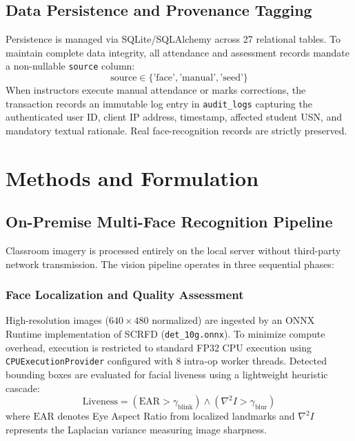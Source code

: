 \documentclass[conference]{IEEEtran}
\begin{document}
\subsection{Data Persistence and Provenance Tagging}
Persistence is managed via SQLite/SQLAlchemy across 27 relational tables. To maintain complete data integrity, all attendance and assessment records mandate a non-nullable \texttt{source} column:
\begin{equation}
\text{source} \in \{\text{'face'}, \text{'manual'}, \text{'seed'}\}
\end{equation}
When instructors execute manual attendance or marks corrections, the transaction records an immutable log entry in \texttt{audit\_logs} capturing the authenticated user ID, client IP address, timestamp, affected student USN, and mandatory textual rationale. Real face-recognition records are strictly preserved.

\section{Methods and Formulation}

\subsection{On-Premise Multi-Face Recognition Pipeline}
Classroom imagery is processed entirely on the local server without third-party network transmission. The vision pipeline operates in three sequential phases:

\subsubsection{Face Localization and Quality Assessment}
High-resolution images ($640 \times 480$ normalized) are ingested by an ONNX Runtime implementation of SCRFD \cite{guo2022sample} (\texttt{det\_10g.onnx}). To minimize compute overhead, execution is restricted to standard FP32 CPU execution using \texttt{CPUExecutionProvider} configured with 8 intra-op worker threads. Detected bounding boxes are evaluated for facial liveness using a lightweight heuristic cascade:
\begin{equation}
\text{Liveness} = (\text{EAR} > \gamma_{\text{blink}}) \land (\nabla^2 I > \gamma_{\text{blur}})
\end{equation}
where $\text{EAR}$ denotes Eye Aspect Ratio from localized landmarks and $\nabla^2 I$ represents the Laplacian variance measuring image sharpness.
\end{document}
